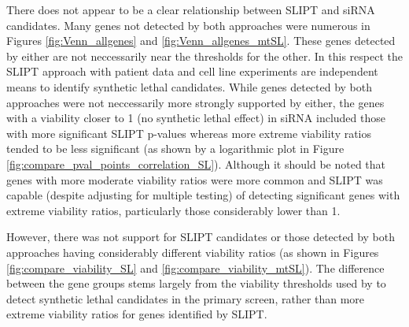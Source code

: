 There does not appear to be a clear relationship between SLIPT and siRNA candidates. Many genes not detected by both approaches were numerous in Figures \ref{fig:Venn_allgenes} and \ref{fig:Venn_allgenes_mtSL}. These genes detected by either are not neccessarily near the thresholds for the other. In this respect the SLIPT approach with patient data and cell line experiments are independent means to identify synthetic lethal candidates. While genes detected by both approaches were not neccessarily more strongly supported by either, the genes with a viability closer to 1 (no synthetic lethal effect) in siRNA included those with more significant SLIPT p-values whereas more extreme viability ratios tended to be less significant (as shown by a logarithmic plot in Figure \ref{fig:compare_pval_points_correlation_SL}). Although it should be noted that genes with more moderate viability ratios were more common and SLIPT was capable (despite adjusting for multiple testing) of detecting significant genes with extreme viability ratios, particularly those considerably lower than 1. 

However, there was not support for SLIPT candidates or those detected by both approaches having considerably different viability ratios (as shown in Figures \ref{fig:compare_viability_SL} and \ref{fig:compare_viability_mtSL}). The difference between the gene groups stems largely from the viability thresholds used by \citet{Telford2015} to detect synthetic lethal candidates in the primary screen, rather than more extreme viability ratios for genes identified by SLIPT. 

